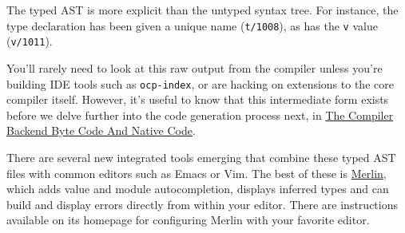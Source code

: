 The typed AST is more explicit than the untyped syntax tree. For
instance, the type declaration has been given a unique name
(\passthrough{\lstinline!t/1008!}), as has the
\passthrough{\lstinline!v!} value (\passthrough{\lstinline!v/1011!}). ~~

You'll rarely need to look at this raw output from the compiler unless
you're building IDE tools such as \passthrough{\lstinline!ocp-index!},
or are hacking on extensions to the core compiler itself. However, it's
useful to know that this intermediate form exists before we delve
further into the code generation process next, in
\href{compiler-backend.html\#the-compiler-backend-byte-code-and-native-code}{The
Compiler Backend Byte Code And Native Code}.

There are several new integrated tools emerging that combine these typed
AST files with common editors such as Emacs or Vim. The best of these is
\href{https://github.com/def-lkb/merlin}{Merlin}, which adds value and
module autocompletion, displays inferred types and can build and display
errors directly from within your editor. There are instructions
available on its homepage for configuring Merlin with your favorite
editor.
